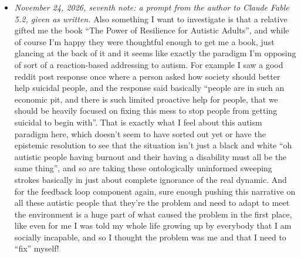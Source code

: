\begin{itemize}
\item \emph{November 24, 2026, seventh note: a prompt from the author to Claude Fable 5.2, given as written.} Also something I want to investigate is that a relative gifted me the book ``The Power of Resilience for Autistic Adults'', and while of course I'm happy they were thoughtful enough to get me a book, just glancing at the back of it and it seems like exactly the paradigm I'm opposing of sort of a reaction-based addressing to autism. For example I saw a good reddit post response once where a person asked how society should better help suicidal people, and the response said basically ``people are in such an economic pit, and there is such limited proactive help for people, that we should be heavily focused on fixing this mess to stop people from getting suicidal to begin with''. That is exactly what I feel about this autism paradigm here, which doesn't seem to have sorted out yet or have the epistemic resolution to see that the situation isn't just a black and white ``oh autistic people having burnout and their having a disability must all be the same thing'', and so are taking these ontologically uninformed sweeping strokes basically in just about complete ignorance of the real dynamic. And for the feedback loop component again, sure enough pushing this narrative on all these autistic people that they're the problem and need to adapt to meet the environment is a huge part of what caused the problem in the first place, like even for me I was told my whole life growing up by everybody that I am socially incapable, and so I thought the problem was me and that I need to ``fix'' myself!

\end{itemize}
